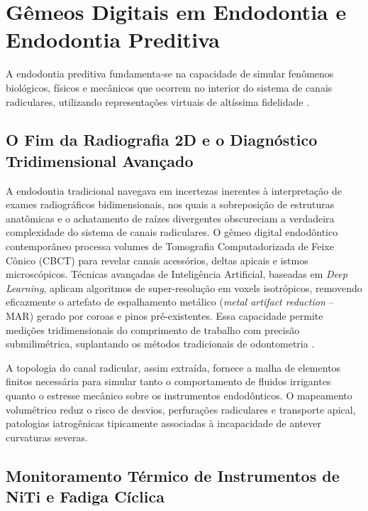\section{Gêmeos Digitais em Endodontia e Endodontia Preditiva}

A endodontia preditiva fundamenta-se na capacidade de simular fenômenos biológicos, físicos e mecânicos que ocorrem no interior do sistema de canais radiculares, utilizando representações virtuais de altíssima fidelidade \cite{bdj2026predictive}.

\subsection{O Fim da Radiografia 2D e o Diagnóstico Tridimensional Avançado}

A endodontia tradicional navegava em incertezas inerentes à interpretação de exames radiográficos bidimensionais, nos quais a sobreposição de estruturas anatômicas e o achatamento de raízes divergentes obscureciam a verdadeira complexidade do sistema de canais radiculares. O gêmeo digital endodôntico contemporâneo processa volumes de Tomografia Computadorizada de Feixe Cônico (CBCT) para revelar canais acessórios, deltas apicais e istmos microscópicos. Técnicas avançadas de Inteligência Artificial, baseadas em \textit{Deep Learning}, aplicam algoritmos de super-resolução em voxels isotrópicos, removendo eficazmente o artefato de espalhamento metálico (\textit{metal artifact reduction} -- MAR) gerado por coroas e pinos pré-existentes. Essa capacidade permite medições tridimensionais do comprimento de trabalho com precisão submilimétrica, suplantando os métodos tradicionais de odontometria \cite{elsaid2025digital}. 


A topologia do canal radicular, assim extraída, fornece a malha de elementos finitos necessária para simular tanto o comportamento de fluidos irrigantes quanto o estresse mecânico sobre os instrumentos endodônticos. O mapeamento volumétrico reduz o risco de desvios, perfurações radiculares e transporte apical, patologias iatrogênicas tipicamente associadas à incapacidade de antever curvaturas severas.

\subsection{Monitoramento Térmico de Instrumentos de NiTi e Fadiga Cíclica}

